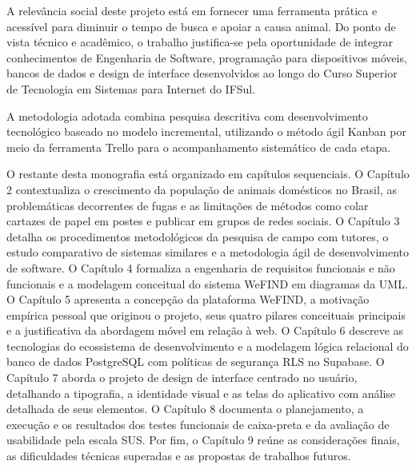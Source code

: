 A relevância social deste projeto está em fornecer uma ferramenta prática e acessível para diminuir o tempo de busca e apoiar a causa animal. Do ponto de vista técnico e acadêmico, o trabalho justifica-se pela oportunidade de integrar conhecimentos de Engenharia de Software, programação para dispositivos móveis, bancos de dados e design de interface desenvolvidos ao longo do Curso Superior de Tecnologia em Sistemas para Internet do IFSul.

A metodologia adotada combina pesquisa descritiva com desenvolvimento tecnológico baseado no modelo incremental, utilizando o método ágil Kanban por meio da ferramenta Trello para o acompanhamento sistemático de cada etapa.

O restante desta monografia está organizado em capítulos sequenciais. O Capítulo 2 contextualiza o crescimento da população de animais domésticos no Brasil, as problemáticas decorrentes de fugas e as limitações de métodos como colar cartazes de papel em postes e publicar em grupos de redes sociais. O Capítulo 3 detalha os procedimentos metodológicos da pesquisa de campo com tutores, o estudo comparativo de sistemas similares e a metodologia ágil de desenvolvimento de software. O Capítulo 4 formaliza a engenharia de requisitos funcionais e não funcionais e a modelagem conceitual do sistema WeFIND em diagramas da UML. O Capítulo 5 apresenta a concepção da plataforma WeFIND, a motivação empírica pessoal que originou o projeto, seus quatro pilares conceituais principais e a justificativa da abordagem móvel em relação à web. O Capítulo 6 descreve as tecnologias do ecossistema de desenvolvimento e a modelagem lógica relacional do banco de dados PostgreSQL com políticas de segurança RLS no Supabase. O Capítulo 7 aborda o projeto de design de interface centrado no usuário, detalhando a tipografia, a identidade visual e as telas do aplicativo com análise detalhada de seus elementos. O Capítulo 8 documenta o planejamento, a execução e os resultados dos testes funcionais de caixa-preta e da avaliação de usabilidade pela escala SUS. Por fim, o Capítulo 9 reúne as considerações finais, as dificuldades técnicas superadas e as propostas de trabalhos futuros.
\clearpage
